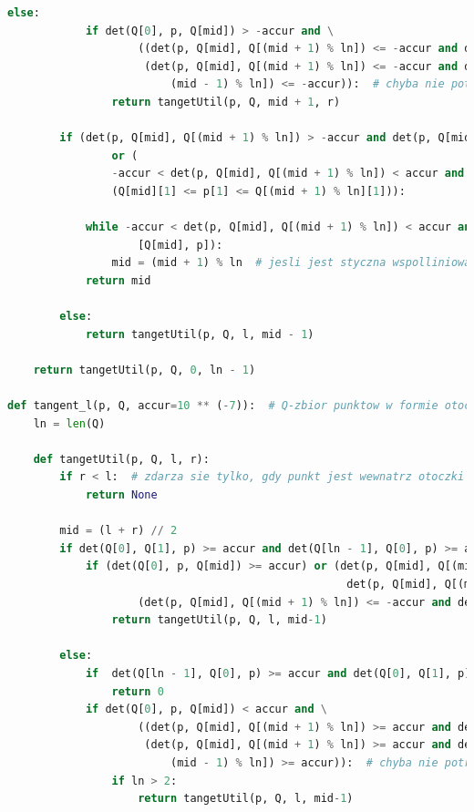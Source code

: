 \documentclass[11pt]{article}
\theoremstyle{remark} \newtheorem{definition}{def.}
\theoremstyle{definition} \newtheorem{twierdzenie}{tw.}
\begin{document}
\begin{lstlisting}[language=Python]
        else:
            if det(Q[0], p, Q[mid]) > -accur and \
                    ((det(p, Q[mid], Q[(mid + 1) % ln]) <= -accur and det(p, Q[mid], Q[(mid - 1) % ln]) > -accur) or \
                     (det(p, Q[mid], Q[(mid + 1) % ln]) <= -accur and det(p, Q[mid], Q[
                         (mid - 1) % ln]) <= -accur)):  # chyba nie potrzebne sprawdz na koncu
                return tangetUtil(p, Q, mid + 1, r)

        if (det(p, Q[mid], Q[(mid + 1) % ln]) > -accur and det(p, Q[mid], Q[(mid - 1) % ln]) > -accur) \
                or (
                -accur < det(p, Q[mid], Q[(mid + 1) % ln]) < accur and (Q[mid][0] <= p[0] <= Q[(mid + 1) % ln][0]) and \
                (Q[mid][1] <= p[1] <= Q[(mid + 1) % ln][1])):

            while -accur < det(p, Q[mid], Q[(mid + 1) % ln]) < accur and length([Q[(mid + 1) % ln], p]) > length(
                    [Q[mid], p]):
                mid = (mid + 1) % ln  # jesli jest styczna wspolliniowa, to bierzmy pod uwage punkt blizszy
            return mid

        else:
            return tangetUtil(p, Q, l, mid - 1)

    return tangetUtil(p, Q, 0, ln - 1)

def tangent_l(p, Q, accur=10 ** (-7)):  # Q-zbior punktow w formie otoczki
    ln = len(Q)

    def tangetUtil(p, Q, l, r):
        if r < l:  # zdarza sie tylko, gdy punkt jest wewnatrz otoczki
            return None

        mid = (l + r) // 2
        if det(Q[0], Q[1], p) >= accur and det(Q[ln - 1], Q[0], p) >= accur:
            if (det(Q[0], p, Q[mid]) >= accur) or (det(p, Q[mid], Q[(mid + 1) % ln]) >= accur and \
                                                    det(p, Q[mid], Q[(mid - 1) % ln]) >= accur) or \
                    (det(p, Q[mid], Q[(mid + 1) % ln]) <= -accur and det(p, Q[mid], Q[(mid - 1) % ln]) > -accur):
                return tangetUtil(p, Q, l, mid-1)

        else:
            if  det(Q[ln - 1], Q[0], p) >= accur and det(Q[0], Q[1], p) <= - accur:
                return 0
            if det(Q[0], p, Q[mid]) < accur and \
                    ((det(p, Q[mid], Q[(mid + 1) % ln]) >= accur and det(p, Q[mid], Q[(mid - 1) % ln]) < accur) or \
                     (det(p, Q[mid], Q[(mid + 1) % ln]) >= accur and det(p, Q[mid], Q[
                         (mid - 1) % ln]) >= accur)):  # chyba nie potrzebne sprawdz na koncu
                if ln > 2:
                    return tangetUtil(p, Q, l, mid-1)


\end{lstlisting}
\end{document}
